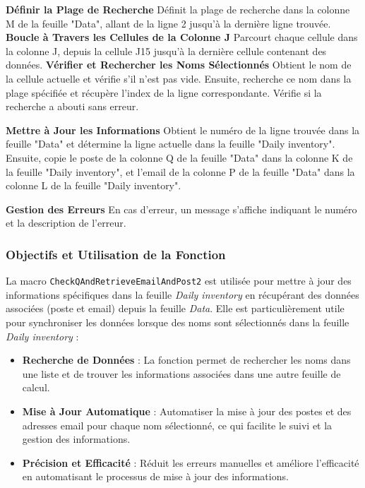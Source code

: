 \documentclass[a4paper, oneside, 12pt, final]{extreport}
\begin{document}
\textbf{Définir la Plage de Recherche}
Définit la plage de recherche dans la colonne M de la feuille "Data", allant de la ligne 2 jusqu'à la dernière ligne trouvée.
\textbf{Boucle à Travers les Cellules de la Colonne J}
Parcourt chaque cellule dans la colonne J, depuis la cellule J15 jusqu'à la dernière cellule contenant des données.
\textbf{Vérifier et Rechercher les Noms Sélectionnés}
Obtient le nom de la cellule actuelle et vérifie s'il n'est pas vide. Ensuite, recherche ce nom dans la plage spécifiée et récupère l'index de la ligne correspondante. Vérifie si la recherche a abouti sans erreur.

\textbf{Mettre à Jour les Informations}
Obtient le numéro de la ligne trouvée dans la feuille "Data" et détermine la ligne actuelle dans la feuille "Daily inventory". Ensuite, copie le poste de la colonne Q de la feuille "Data" dans la colonne K de la feuille "Daily inventory", et l'email de la colonne P de la feuille "Data" dans la colonne L de la feuille "Daily inventory".

\textbf{Gestion des Erreurs}
En cas d'erreur, un message s'affiche indiquant le numéro et la description de l'erreur.

\subsubsection{Objectifs et Utilisation de la Fonction}

La macro \texttt{CheckQAndRetrieveEmailAndPost2} est utilisée pour mettre à jour des informations spécifiques dans la feuille \textit{Daily inventory} en récupérant des données associées (poste et email) depuis la feuille \textit{Data}. Elle est particulièrement utile pour synchroniser les données lorsque des noms sont sélectionnés dans la feuille \textit{Daily inventory} :

\begin{itemize}
    \item \textbf{Recherche de Données} : La fonction permet de rechercher les noms dans une liste et de trouver les informations associées dans une autre feuille de calcul.
    \item \textbf{Mise à Jour Automatique} : Automatiser la mise à jour des postes et des adresses email pour chaque nom sélectionné, ce qui facilite le suivi et la gestion des informations.
    \item \textbf{Précision et Efficacité} : Réduit les erreurs manuelles et améliore l'efficacité en automatisant le processus de mise à jour des informations.
\end{itemize}
\end{document}
